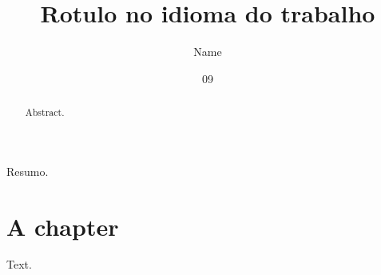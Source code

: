 \documentclass[dsc,english]{ufrj}
\title{Rotulo no idioma do trabalho}
\author{Name}{Surname}
\date{09}{2026}
\begin{document}
  \maketitle
  \frontmatter
  \begin{abstract}Abstract.\end{abstract}
  \begin{foreignabstract}Resumo.\end{foreignabstract}
  \tableofcontents
  \mainmatter
  \chapter{A chapter}
  Text.
\end{document}
